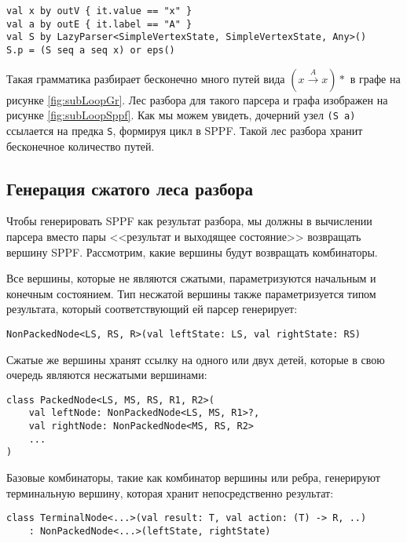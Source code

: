 \begin{lstlisting}[float=h, label={lst:loopParser}, caption=Пример парсера графа с циклом]
val x by outV { it.value == "x" }
val a by outE { it.label == "A" }
val S by LazyParser<SimpleVertexState, SimpleVertexState, Any>()
S.p = (S seq a seq x) or eps()
\end{lstlisting}

Такая грамматика разбирает бесконечно много путей вида $(x \xrightarrow{A} x)*$ в графе на рисунке \ref{fig:subLoopGr}. Лес разбора для такого парсера и графа изображен на рисунке \ref{fig:subLoopSppf}. Как мы можем увидеть, дочерний узел \texttt{(S a)} ссылается на предка \texttt{S}, формируя цикл в SPPF. Такой лес разбора хранит бесконечное количество путей.

\subsection{Генерация сжатого леса разбора}

Чтобы генерировать SPPF как результат разбора, мы должны в вычислении парсера вместо пары <<результат и выходящее состояние>> возвращать вершину SPPF. Рассмотрим, какие вершины будут возвращать комбинаторы.

Все вершины, которые не являются сжатыми, параметризуются начальным и конечным состоянием. Тип несжатой вершины также параметризуется типом результата, который соответствующий ей парсер генерирует:
\begin{lstlisting}
NonPackedNode<LS, RS, R>(val leftState: LS, val rightState: RS)
\end{lstlisting}

Сжатые же вершины хранят ссылку на одного или двух детей, которые в свою очередь являются несжатыми вершинами:

\begin{nobreaks}
    \begin{lstlisting}
class PackedNode<LS, MS, RS, R1, R2>(
    val leftNode: NonPackedNode<LS, MS, R1>?,
    val rightNode: NonPackedNode<MS, RS, R2>
    ...
)
\end{lstlisting}
\end{nobreaks}

Базовые комбинаторы, такие как комбинатор вершины или ребра, генерируют терминальную вершину, которая хранит непосредственно результат: 

\begin{nobreaks}
    \begin{lstlisting}
class TerminalNode<...>(val result: T, val action: (T) -> R, ..)  
    : NonPackedNode<...>(leftState, rightState)
\end{lstlisting}
\end{nobreaks}

